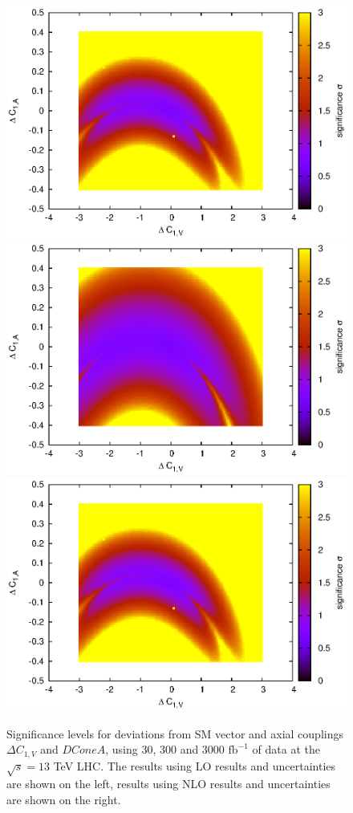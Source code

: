 \documentclass[preprint]{JHEP3} %
\def\invfb {\mathrm{fb}^{-1}}
\def\DConeV{\Delta C_{1,V}}
\begin{document}
\begin{figure}[t]
\includegraphics[scale=0.6]{BLLNLO1223sig_SUA2_300_1.15.eps} 
\\
\includegraphics[scale=0.6]{BLLLO1223HSsig_SUA2_300_1.30.eps} 
\includegraphics[scale=0.6]{BLLNLO1223sig_SUA2_300_1.15.eps} 
\caption{Significance levels for deviations from SM vector and axial couplings $\DConeV$ and $DConeA$,  using 30, 300 and 3000 $\invfb$ of data at the $\sqrt{s}=13$ TeV LHC. 
The results using LO results and uncertainties are shown on the left, results using NLO results and uncertainties are shown on the right.} \label{fig:LHC13sigLO} 
\end{figure}
\end{document}
